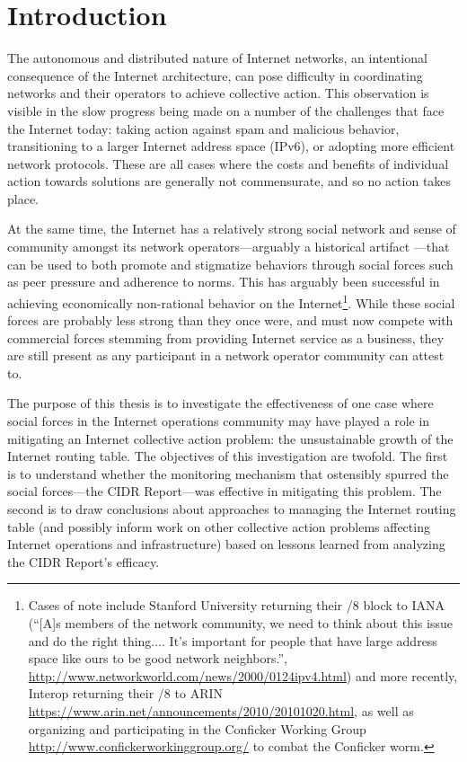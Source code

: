 \chapter{Introduction}
\label{chap:intro}

The autonomous and distributed nature of Internet networks, an intentional consequence of the Internet architecture, can pose difficulty in coordinating networks and their operators to achieve collective action. This observation is visible in the slow progress being made on a number of the challenges that face the Internet today: taking action against spam and malicious behavior, transitioning to a larger Internet address space (IPv6), or adopting more efficient network protocols. These are all cases where the costs and benefits of individual action towards solutions are generally not commensurate, and so no action takes place.

At the same time, the Internet has a relatively strong social network and sense of community amongst its network operators---arguably a historical artifact \cite{Mathew:2010ly}---that can be used to both promote and stigmatize behaviors through social forces such as peer pressure and adherence to norms. This has arguably been successful in achieving economically non-rational behavior on the Internet\footnote{Cases of note include Stanford University returning their /8 block to IANA (``[A]s members of the network community, we need to think about this issue and do the right thing.... It's important for people that have large address space like ours to be good network neighbors.'', \url{http://www.networkworld.com/news/2000/0124ipv4.html}) and more recently, Interop returning their /8 to ARIN \url{https://www.arin.net/announcements/2010/20101020.html}, as well as organizing and participating in the Conficker Working Group \url{http://www.confickerworkinggroup.org/} to combat the Conficker worm. }.
While these social forces are probably less strong than they once were, and must now compete with commercial forces stemming from providing Internet service as a business, they are still present as any participant in a network operator community can attest to. 

The purpose of this thesis is to investigate the effectiveness of one case where social forces in the Internet operations community may have played a role in mitigating an Internet collective action problem: the unsustainable growth of the Internet routing table. The objectives of this investigation are twofold. The first is to understand whether the monitoring mechanism that ostensibly spurred the social forces---the CIDR Report---was effective in mitigating this problem. The second is to draw conclusions about approaches to managing the Internet routing table (and possibly inform work on other collective action problems affecting Internet operations and infrastructure) based on lessons learned from analyzing the CIDR Report's efficacy.
%

